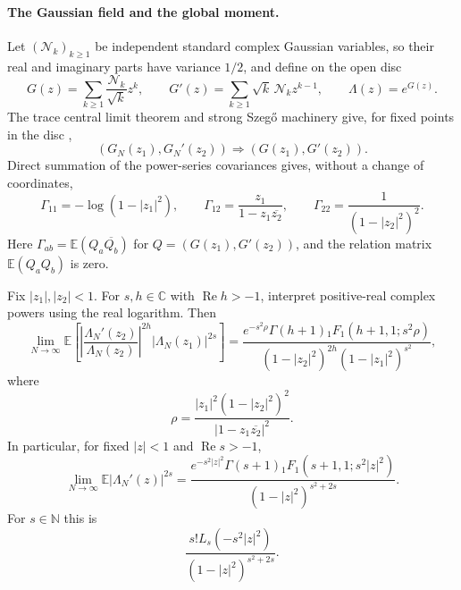 \paragraph{The Gaussian field and the global moment.}
Let $(\mathcal N_k)_{k\geq1}$ be independent standard complex Gaussian variables, so their
real and imaginary parts have variance $1/2$, and define on the open disc
\begin{equation}
 G(z)=\sum_{k\geq1}\frac{\mathcal N_k}{\sqrt{k}}z^k,
 \qquad
 G'(z)=\sum_{k\geq1}\sqrt{k}\,\mathcal N_k z^{k-1},
 \qquad \Lambda(z)=e^{G(z)}.
 \label{eq:SW-Gaussian-field}
\end{equation}
The trace central limit theorem and strong Szeg\H{o} machinery give, for fixed points in the
disc \cite{diaconisShahshahani1994,diaconisEvans2001,johansson1997},
\begin{equation}
 (G_N(z_1),G_N'(z_2))\Longrightarrow(G(z_1),G'(z_2)).
 \label{eq:SW-joint-convergence}
\end{equation}
Direct summation of the
power-series covariances gives, without a change of coordinates,
\begin{equation}
 \Gamma_{11}=-\log(1-|z_1|^2),\qquad
 \Gamma_{12}=\frac{z_1}{1-z_1\overline{z_2}},\qquad
 \Gamma_{22}=\frac1{(1-|z_2|^2)^2}.
 \label{eq:SW-covariance}
\end{equation}
Here $\Gamma_{ab}=\mathbb E(Q_a\overline{Q_b})$ for
$Q=(G(z_1),G'(z_2))$, and the relation matrix $\mathbb E(Q_aQ_b)$ is zero.

\begin{theorem}
\label{thm:SW-global-joint}
Fix $|z_1|,|z_2|<1$.  For $s,h\in\mathbb C$ with $\operatorname{Re}h>-1$, interpret
positive-real complex powers using the real logarithm.  Then
\begin{equation}
 \lim_{N\to\infty}\mathbb E\!\left[
 \left|\frac{\Lambda_N'(z_2)}{\Lambda_N(z_2)}\right|^{2h}
 |\Lambda_N(z_1)|^{2s}\right]
 =\frac{e^{-s^2\rho}\Gamma(h+1){}_1F_1(h+1,1;s^2\rho)}
 {(1-|z_2|^2)^{2h}(1-|z_1|^2)^{s^2}},
 \label{eq:SW-global-joint}
\end{equation}
where
\begin{equation}
 \rho=\frac{|z_1|^2(1-|z_2|^2)^2}{|1-z_1\overline{z_2}|^2}.
 \label{eq:SW-rho}
\end{equation}
In particular, for fixed $|z|<1$ and $\operatorname{Re}s>-1$,
\begin{equation}
 \lim_{N\to\infty}\mathbb E|\Lambda_N'(z)|^{2s}
 =\frac{e^{-s^2|z|^2}\Gamma(s+1){}_1F_1(s+1,1;s^2|z|^2)}
 {(1-|z|^2)^{s^2+2s}}.
 \label{eq:SW-global-derivative}
\end{equation}
For $s\in\mathbb N$ this is
\begin{equation}
 \frac{s!L_s(-s^2|z|^2)}{(1-|z|^2)^{s^2+2s}}.
 \label{eq:SW-global-integer}
\end{equation}
\end{theorem}

